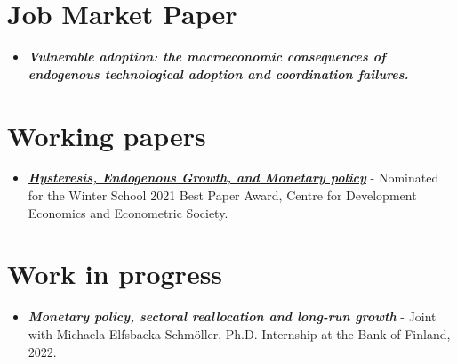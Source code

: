 \documentclass{res}
\begin{document}
\begin{normalsize}
\section{\textbf{Job Market Paper}}
\begin{itemize}
\item \textbf{\textit{Vulnerable adoption: the macroeconomic consequences of endogenous technological adoption and coordination failures.}}
\end{itemize}
\section{\textbf{Working papers}}
\begin{itemize}
\item \href{https://ideas.repec.org/p/cda/wpaper/348.html}{\textbf{\textit{Hysteresis, Endogenous Growth,  and Monetary policy}}} - Nominated for the Winter School 2021 Best Paper Award,  Centre for Development Economics and Econometric Society.
\end{itemize}
\section{\textbf{Work in progress}}
\begin{itemize}
\item \textbf{\textit{Monetary policy,  sectoral reallocation and long-run growth}} - Joint with Michaela Elfsbacka-Schm\"{o}ller,  Ph.D. Internship at the Bank of Finland, 2022.
\end{itemize}

\end{normalsize}
\end{document}
